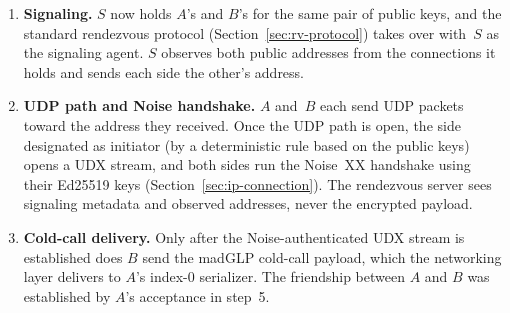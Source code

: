\begin{enumerate}
\item \textbf{Signaling.}  $S$ now holds $A$'s  and $B$'s  for the same pair of public keys, and the standard rendezvous protocol (Section~\ref{sec:rv-protocol}) takes over with~$S$ as the signaling agent.  $S$ observes both public addresses from the connections it holds and sends each side the other's address.

\item \textbf{UDP path and Noise handshake.}  $A$ and~$B$ each send UDP packets toward the address they received.  Once the UDP path is open, the side designated as initiator (by a deterministic rule based on the public keys) opens a UDX stream, and both sides run the Noise~XX handshake using their Ed25519 keys (Section~\ref{sec:ip-connection}).  The rendezvous server sees signaling metadata and observed addresses, never the encrypted payload.

\item \textbf{Cold-call delivery.}  Only after the Noise-authenticated UDX stream is established does $B$ send the madGLP cold-call payload, which the networking layer delivers to $A$'s index-0 serializer.  The friendship between $A$ and $B$ was established by $A$'s acceptance in step~5.
\end{enumerate}
